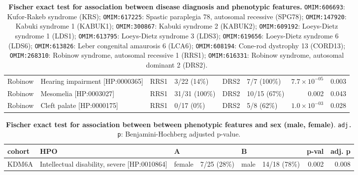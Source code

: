 \begin{table}
\begin{scriptsize}
\begin{tabular}{l>{\raggedright}p{2.5cm}llllrr}
Robinow & Hearing impairment [HP:0000365] &RRS1& 3/22 (14\%) & DRS2 & 7/7 (100\%) & $7.7 \times 10^{-05}$ & 0.003\\
Robinow & Mesomelia [HP:0003027] & RRS1 & 31/31 (100\%) & DRS2 & 10/15 (67\%) & 0.002 & 0.043\\
Robinow & Cleft palate [HP:0000175] & RRS1 & 0/17 (0\%) & DRS2 & 5/8 (62\%) & $1.0 \times 10^{-03}$ & 0.028\\
\bottomrule
\end{tabular}
\end{scriptsize}
\caption{\textbf{Fischer exact test for association between disease diagnosis and phenotypic features.}
\texttt{OMIM:606693}: Kufor-Rakeb syndrome (KRS);
 \texttt{OMIM:617225}: Spastic paraplegia 78, autosomal recessive (SPG78);
 \texttt{OMIM:147920}: Kabuki syndrome 1 (KABUK1);
 \texttt{OMIM:300867}: Kabuki syndrome 2 (KABUK2);
 \texttt{OMIM:609192}: Loeys-Dietz syndrome 1 (LDS1);
 \texttt{OMIM:613795}:  Loeys-Dietz syndrome 3 (LDS3);
 \texttt{OMIM:619656}: Loeys-Dietz syndrome 6 (LDS6);
 \texttt{OMIM:613826}: Leber congenital amaurosis 6 (LCA6);
 \texttt{OMIM:608194}:  Cone-rod dystrophy 13 (CORD13);
 \texttt{OMIM:268310}: Robinow syndrome, autosomal recessive 1 (RRS1);
 \texttt{OMIM:616331}: Robinow syndrome, autosomal dominant 2 (DRS2).
}
\label{tab:disease_dx}
\end{table}



\clearpage
\newpage

\begin{table}
\centering
\begin{tabular}{l>{\raggedright}p{4cm}lp{2cm}lp{2.4cm}rr}
\toprule
\textbf{cohort} & \textbf{HPO} & \textbf{A} & \textbf{} & \textbf{B} & \textbf{} & \textbf{p-val} & \textbf{adj. p}\\
\midrule
KDM6A & Intellectual disability, severe [HP:0010864] & female & 7/25 (28\%) & male & 14/18 (78\%) & 0.002 & 0.008\\
\bottomrule
\end{tabular}
\caption{\textbf{Fischer exact test for association between  between phenotypic features and sex (male, female)}. \texttt{adj. p}: Benjamini-Hochberg adjusted p-value.}
\label{tab:mf_hpo}
\end{table}

\clearpage
\newpage


